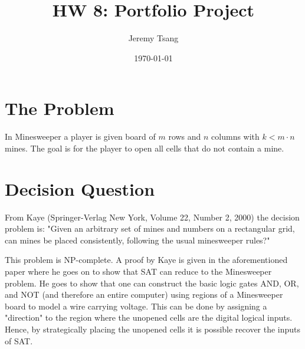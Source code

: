 \documentclass[11pt]{article}
\author{Jeremy Tsang}
\date{\today}
\title{HW 8: Portfolio Project}
\begin{document}
\maketitle
\section*{The Problem}
\label{sec:org694a4fc}
In Minesweeper a player is given board of \(m\) rows and \(n\) columns with \(k < m\cdot n\) mines. The goal is for the player to open all cells that do not contain a mine.
\section*{Decision Question}
\label{sec:org5d1772a}
From Kaye (Springer-Verlag New York, Volume 22, Number 2, 2000) the decision problem is: "Given an arbitrary set of mines and numbers on a rectangular grid, can mines be placed consistently, following the usual minesweeper rules?"

This problem is NP-complete. A proof by Kaye is given in the aforementioned paper where he goes on to show that SAT can reduce to the Minesweeper problem. He goes to show that one can construct the basic logic gates AND, OR, and NOT (and therefore an entire computer) using regions of a Minesweeper board to model a wire carrying voltage. This can be done by assigning a "direction" to the region where the unopened cells are the digital logical inputs. Hence, by strategically placing the unopened cells it is possible recover the inputs of SAT.
\end{document}

